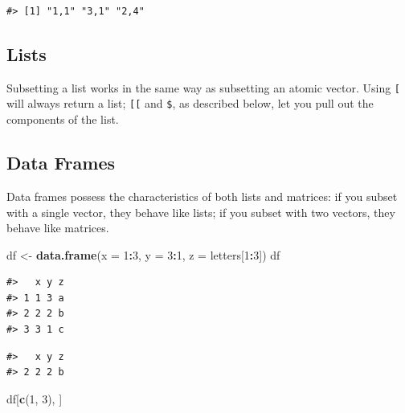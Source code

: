 \documentclass[]{book}
\newenvironment{Shaded}{\begin{snugshade}}{\end{snugshade}}
\newcommand{\KeywordTok}[1]{\textcolor[rgb]{0.13,0.29,0.53}{\textbf{#1}}}
\newcommand{\DataTypeTok}[1]{\textcolor[rgb]{0.13,0.29,0.53}{#1}}
\newcommand{\DecValTok}[1]{\textcolor[rgb]{0.00,0.00,0.81}{#1}}
\newcommand{\StringTok}[1]{\textcolor[rgb]{0.31,0.60,0.02}{#1}}
\newcommand{\OperatorTok}[1]{\textcolor[rgb]{0.81,0.36,0.00}{\textbf{#1}}}
\newcommand{\NormalTok}[1]{#1}
\theoremstyle{definition}
\theoremstyle{definition}
\theoremstyle{definition}
\theoremstyle{remark}
\begin{document}
\begin{verbatim}
#> [1] "1,1" "3,1" "2,4"
\end{verbatim}

\subsection{Lists}\label{lists-1}

Subsetting a list works in the same way as subsetting an atomic vector.
Using \texttt{{[}} will always return a list; \texttt{{[}{[}} and
\texttt{\$}, as described below, let you pull out the components of the
list.

\subsection{Data Frames}\label{data-frames-1}

Data frames possess the characteristics of both lists and matrices: if
you subset with a single vector, they behave like lists; if you subset
with two vectors, they behave like matrices.

\begin{Shaded}
\begin{Highlighting}[]
\NormalTok{df <-}\StringTok{ }\KeywordTok{data.frame}\NormalTok{(}\DataTypeTok{x =} \DecValTok{1}\OperatorTok{:}\DecValTok{3}\NormalTok{, }\DataTypeTok{y =} \DecValTok{3}\OperatorTok{:}\DecValTok{1}\NormalTok{, }\DataTypeTok{z =}\NormalTok{ letters[}\DecValTok{1}\OperatorTok{:}\DecValTok{3}\NormalTok{])}
\NormalTok{df}
\end{Highlighting}
\end{Shaded}

\begin{verbatim}
#>   x y z
#> 1 1 3 a
#> 2 2 2 b
#> 3 3 1 c
\end{verbatim}

\begin{Shaded}
\end{Shaded}

\begin{verbatim}
#>   x y z
#> 2 2 2 b
\end{verbatim}

\begin{Shaded}
\begin{Highlighting}[]
\NormalTok{df[}\KeywordTok{c}\NormalTok{(}\DecValTok{1}\NormalTok{, }\DecValTok{3}\NormalTok{), ]}
\end{Highlighting}
\end{Shaded}
\end{document}
